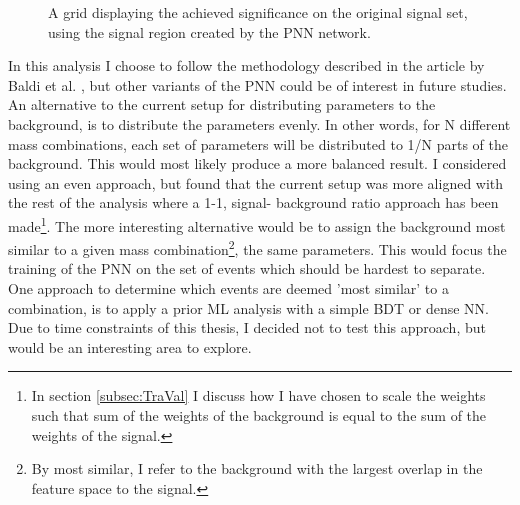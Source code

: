 \begin{figure} 
    \caption{A grid displaying the achieved significance on the original signal set, using the signal region 
    created by the \ac{PNN} network.}
    \label{fig:PNNGridSig}
\end{figure}
In this analysis I choose to follow the methodology described in the article by Baldi et al. \cite{PNN}, but other variants of the \ac{PNN} could 
be of interest in future studies. An alternative to the current setup for distributing parameters to the background, is to distribute the parameters evenly. 
In other words, for N different mass combinations, each set of parameters will be distributed to 1/N parts of the background. This would most likely produce a
more balanced result. I considered using an even approach, but found that the current setup was more aligned with the rest of the analysis where a 1-1, signal-
background ratio approach has been made\footnote{In section \ref{subsec:TraVal} I discuss how I have chosen to scale the weights such that sum of the weights of 
the background is equal to the sum of the weights of the signal.}. The more interesting alternative would be to assign the background most similar to a given mass 
combination\footnote{By most similar, I refer to the background with the largest overlap in the feature space to the signal.}, the same parameters. This would 
focus the training of the \ac{PNN} on the set of events which should be hardest to separate. One approach to determine which events are deemed 'most similar' to a 
combination, is to apply a prior \ac{ML} analysis with a simple \ac{BDT} or dense \ac{NN}. Due to time constraints of this thesis, I decided not to test this 
approach, but would be an interesting area to explore.